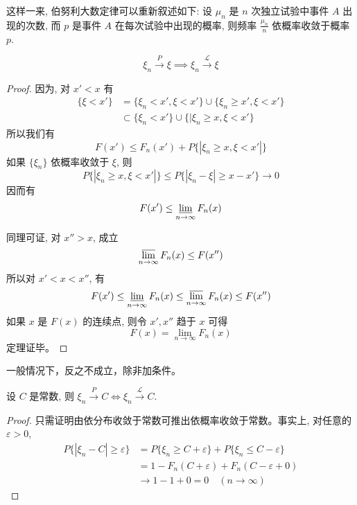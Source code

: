 \begin{remark}
    这样一来, 伯努利大数定律可以重新叙述如下:
设 $\mu_n$ 是 $n$ 次独立试验中事件 $A$ 出现的次数, 而 $p$ 是事件 $A$ 在每次试验中出现的概率, 则频率 $\frac{\mu_n}{n}$ 依概率收敛于概率 $p$.
\end{remark}

\begin{theorem}[依概率收敛推出依分布收敛]\label{thm:prob_to_dist}
\[\xi_n \xrightarrow{P} \xi \implies \xi_n \xrightarrow{\mathscr{L}} \xi\]
\end{theorem}

\begin{proof}
因为, 对 $x'<x$ 有
\begin{align*}
\{\xi < x'\} &= \{\xi_n < x', \xi < x'\} \cup \{\xi_n \ge x', \xi < x'\} \\
&\subset \{\xi_n < x'\} \cup \{|\xi_n \ge x, \xi < x'\}
\end{align*}
所以我们有
\[
F(x') \le F_n(x') + P\{|\xi_n \ge x, \xi < x'|\}
\]
如果 $\{\xi_n\}$ 依概率收敛于 $\xi$, 则
\[
P\{|\xi_n \ge x, \xi < x'|\} \le P\{|\xi_n - \xi| \ge x - x'\} \to 0
\]
因而有
\[
F(x') \le \varliminf_{n\to\infty} F_n(x)
\]

同理可证, 对 $x''>x$, 成立
\[
\varlimsup_{n\to\infty} F_n(x) \le F(x'')
\]
所以对 $x'<x<x''$, 有
\[
F(x') \le \varliminf_{n\to\infty} F_n(x) \le \varlimsup_{n\to\infty} F_n(x) \le F(x'')
\]
如果 $x$ 是 $F(x)$ 的连续点, 则令 $x',x''$ 趋于 $x$ 可得
\[
F(x) = \lim_{n\to\infty} F_n(x)
\]
定理证毕。
\end{proof}
\begin{remark}
    一般情况下，反之不成立，除非加条件。
\end{remark}

\begin{theorem}\label{thm:const_conv}
设 $C$ 是常数, 则 $\xi_n \xrightarrow{P} C \iff \xi_n \xrightarrow{\mathscr{L}} C$.
\end{theorem}

\begin{proof}
只需证明由依分布收敛于常数可推出依概率收敛于常数。事实上, 对任意的 $\varepsilon>0$,
\begin{align*}
P\{|\xi_n -C| \ge \varepsilon\} &= P\{\xi_n \ge C+\varepsilon\} + P\{\xi_n \le C-\varepsilon\} \\
&= 1-F_n(C+\varepsilon) + F_n(C-\varepsilon+0) \\
&\to 1-1+0=0 \quad (n \to \infty)
\end{align*}
\end{proof}

